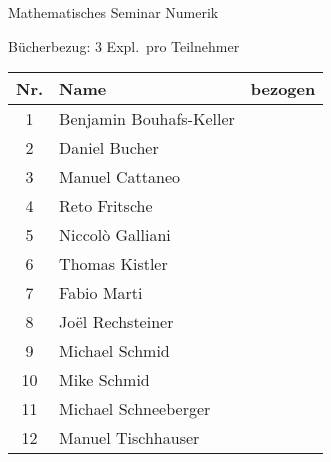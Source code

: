 \documentclass[a4paper,12pt]{article}
\begin{document}
\begin{center}
\renewcommand\arraystretch{1.8}
\large
\begin{center}
\Large
Mathematisches Seminar Numerik
\end{center}
\bigskip
\begin{center}
\large
Bücherbezug: 3 Expl.~pro Teilnehmer
\end{center}
\bigskip
\pagestyle{empty}
\begin{tabular}{|c|l|c|}
\hline
Nr.&Name&bezogen\\
\hline
\hline
 1&Benjamin Bouhafs-Keller   & \\ \hline
 2&Daniel Bucher             & \\ \hline
 3&Manuel Cattaneo           & \\ \hline
 4&Reto Fritsche             & \\ \hline
 5&Niccolò Galliani          & \\ \hline
 6&Thomas Kistler            & \\ \hline
 7&Fabio Marti               & \\ \hline
 8&Joël Rechsteiner          & \\ \hline
 9&Michael Schmid            & \\ \hline
10&Mike Schmid               & \\ \hline
11&Michael Schneeberger      & \\ \hline
12&Manuel Tischhauser        & \\ \hline
\end{tabular}
\end{center}
\end{document}

